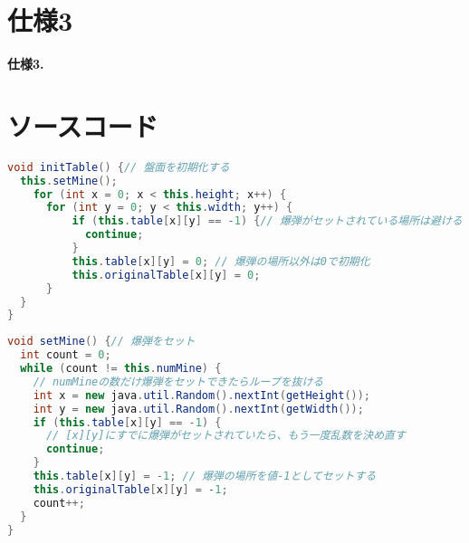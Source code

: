 \documentclass[a4j,11pt]{jsarticle}
\begin{document}
\section*{仕様3}
\setcounter{section}{3}
\setcounter{subsection}{0}
\setcounter{lstlisting}{0}
\begin{screen}
    \textbf{仕様3.}\\
\end{screen}
\newpage
\section*{ソースコード}
\lstset{frame=shadowbox,numbers=left}
\begin{lstlisting}[caption=\ttfamily initTable, label=src:initTable, language=Java]
void initTable() {// 盤面を初期化する
  this.setMine();
    for (int x = 0; x < this.height; x++) {
      for (int y = 0; y < this.width; y++) {
          if (this.table[x][y] == -1) {// 爆弾がセットされている場所は避ける
            continue;
          }
          this.table[x][y] = 0; // 爆弾の場所以外は0で初期化
          this.originalTable[x][y] = 0;
      }
  }
}
\end{lstlisting}
\begin{lstlisting}[caption=\ttfamily setMine, label=src:setMine, language=Java]
void setMine() {// 爆弾をセット
  int count = 0;
  while (count != this.numMine) {
    // numMineの数だけ爆弾をセットできたらループを抜ける
    int x = new java.util.Random().nextInt(getHeight());
    int y = new java.util.Random().nextInt(getWidth());
    if (this.table[x][y] == -1) {
      // [x][y]にすでに爆弾がセットされていたら、もう一度乱数を決め直す
      continue;
    }
    this.table[x][y] = -1; // 爆弾の場所を値-1としてセットする
    this.originalTable[x][y] = -1;
    count++;
  }
}
\end{lstlisting}
\end{document}
